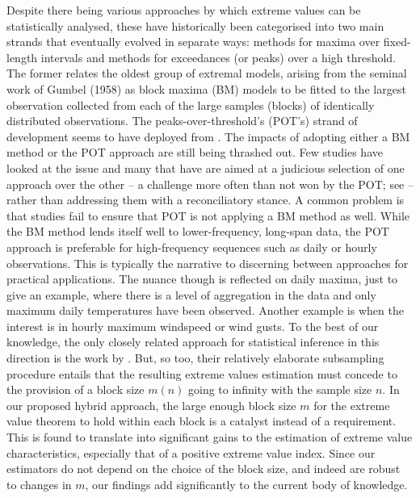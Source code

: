\documentclass[11pt, a4paper, oneside]{article}
\numberwithin{equation}{section}
\theoremstyle{plain}
\theoremstyle{definition}
\begin{document}
Despite there being various approaches by which extreme values can be statistically analysed, these have historically been categorised into two main strands that eventually evolved in separate ways:
methods for maxima over fixed-length intervals and methods for exceedances (or peaks) over a high threshold. The former relates the oldest group of extremal models, arising from the seminal work of Gumbel (1958) as block maxima (BM) models to be fitted to the largest observation collected from each of the large samples (blocks) of identically distributed observations. The peaks-over-threshold's (POT's) strand of development seems to have deployed from \citet{TodorovicZelenhasic1970}. The impacts of adopting either a BM method or the POT approach are still being thrashed out. Few studies have looked at the issue and many that have are aimed at a judicious selection of one approach over the other  -- a challenge more often than not won by the POT; see \cite{BucherZhou2021} -- rather than addressing them with a reconciliatory stance. A common problem is that studies fail to ensure that POT is not applying a BM method as well. While the BM method lends itself well to lower-frequency, long-span data, the POT approach is preferable for high-frequency sequences such as daily or hourly observations. This is typically the narrative to discerning  between approaches for practical applications. The nuance though is reflected on daily maxima, just to give an example, where there is a level of aggregation in the data and only maximum daily temperatures have been observed. Another example is when the interest is in hourly maximum windspeed or wind gusts. To the best of our knowledge, the only closely related approach for statistical inference in this direction is the work by \cite{Wager2014}. But, so too, their relatively elaborate subsampling procedure entails that the resulting extreme values estimation must concede to the provision of a block size $m(n)$ going to infinity with the sample size $n$. In our proposed hybrid approach, the large enough block size $m$ for the extreme value theorem to hold within each block is a catalyst instead of a requirement. This is found to translate into significant gains to the estimation of extreme value characteristics, especially that of a positive extreme value index. Since our estimators do not depend on the choice of the block size, and indeed are robust to changes in $m$, our findings add significantly to the current body of knowledge.
\end{document}
